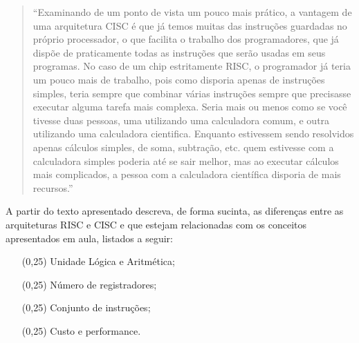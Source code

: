 \begin{quote}
  ``Examinando de um ponto de vista um pouco mais prático, a vantagem
  de uma arquitetura CISC é que já temos muitas das instruções
  guardadas no próprio processador, o que facilita o trabalho dos
  programadores, que já dispõe de praticamente todas as instruções que
  serão usadas em seus programas. No caso de um chip estritamente
  RISC, o programador já teria um pouco mais de trabalho, pois como
  disporia apenas de instruções simples, teria sempre que combinar
  várias instruções sempre que precisasse executar alguma tarefa mais
  complexa. Seria mais ou menos como se você tivesse duas pessoas, uma
  utilizando uma calculadora comum, e outra utilizando uma calculadora
  cientifica. Enquanto estivessem sendo resolvidos apenas cálculos
  simples, de soma, subtração, etc. quem estivesse com a calculadora
  simples poderia até se sair melhor, mas ao executar cálculos mais
  complicados, a pessoa com a calculadora científica disporia de mais
  recursos.''
\end{quote}

A partir do texto apresentado descreva, de forma sucinta, as
diferenças entre as arquiteturas RISC e CISC e que estejam
relacionadas com os conceitos apresentados em aula, listados a seguir:

\begin{itemize}
\item[(0,25)] Unidade Lógica e Aritmética;
\item[(0,25)] Número de registradores;
\item[(0,25)] Conjunto de instruções;
\item[(0,25)] Custo e performance.

\end{itemize}
